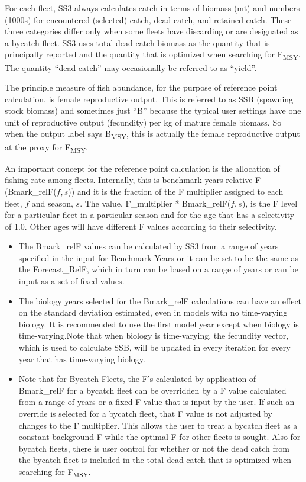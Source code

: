 For each fleet, SS3 always calculates catch in terms of biomass (mt) and numbers (1000s) for encountered (selected) catch, dead catch, and retained catch. These three categories differ only when some fleets have discarding or are designated as a bycatch fleet. SS3 uses total dead catch biomass as the quantity that is principally reported and the quantity that is optimized when searching for F\textsubscript{MSY}. The quantity ``dead catch'' may occasionally be referred to as ``yield''.

The principle measure of fish abundance, for the purpose of reference point calculation, is female reproductive output. This is referred to as SSB (spawning stock biomass) and sometimes just ``B'' because the typical user settings have one unit of reproductive output (fecundity) per kg of mature female biomass. So when the output label says B\textsubscript{MSY}, this is actually the female reproductive output at the proxy for F\textsubscript{MSY}.

An important concept for the reference point calculation is the allocation of fishing rate among fleets. Internally, this is benchmark years relative F (Bmark\_relF($f,s$)) and it is the fraction of the F multiplier assigned to each fleet, $f$ and season, $s$. The value, F\_multiplier * Bmark\_relF($f,s$), is the F level for a particular fleet in a particular season and for the age that has a selectivity of 1.0. Other ages will have different F values according to their selectivity.

\begin{itemize}
	\item The Bmark\_relF values can be calculated by SS3 from a range of years specified in the input for Benchmark Years or it can be set to be the same as the Forecast\_RelF, which in turn can be based on a range of years or can be input as a set of fixed values.
	
	\item The biology years selected for the Bmark\_relF calculations can have an effect on the standard deviation estimated, even in models with no time-varying biology. It is recommended to use the first model year except when biology is time-varying.Note that when biology is time-varying, the fecundity vector, which is used to calculate SSB, will be updated in every iteration for every year that has time-varying biology.
	
	\item Note that for Bycatch Fleets, the F's calculated by application of Bmark\_relF for a bycatch fleet can be overridden by a F value calculated from a range of years or a fixed F value that is input by the user. If such an override is selected for a bycatch fleet, that F value is not adjusted by changes to the F multiplier. This allows the user to treat a bycatch fleet as a constant background F while the optimal F for other fleets is sought. Also for bycatch fleets, there is user control for whether or not the dead catch from the bycatch fleet is included in the total dead catch that is optimized when searching for F\textsubscript{MSY}.
\end{itemize}

